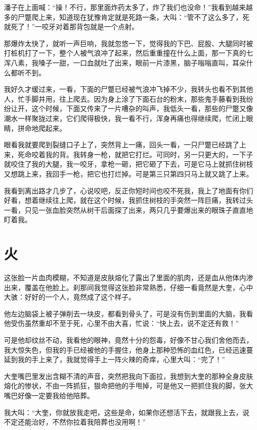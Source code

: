 潘子在上面喊：“操！不行，那里面炸药太多了，炸了我们也没命！”我看到越来越多的尸蹩爬上来，知道现在犹豫肯定就是死路一条，大叫：“管不了这么多了，死就死了！”一咬牙对着那背包就是一个点射。

那爆炸太快了，就听一声巨响，我就忽悠一下，觉得我的下巴、屁股、大腿同时被打桩机打了一下，整个人被气浪冲了起来，然后重重撞在什么上面，那一下真的七浑八素，我嗓子一甜，一口血就吐了出来，眼前一片漆黑，脑子嗡嗡直叫，耳朵什么都听不到。

我好久才缓过来，一看，下面的尸蹩已经被气浪冲飞掉不少，我转头也看不到其他人，忙手脚并用，往上爬去。因为身上涂了下面石台的粉末，那些鬼手藤看到我纷纷让开，这个时候，下面又传来了一片嘈杂的叫声，我低头一看，那些的尸蹩又像潮水一样聚拢过来，它们爬得极快，我一看不行，浑身再痛也得继续爬，忙闭上眼睛，拼命地爬起来。

眼看我就要爬到裂缝口子上了，突然背上一痛，回头一看，一只尸蹩已经跳了上来，死命咬着我的背。我转身一枪，就把它打烂。可同时，另一只更大的，一下子就咬住了我的大腿，我一咬牙，拿枪一砸，把它砸了下去，可是它马上就抓住树枝又想跳上来，我回手一枪，把它也打烂掉。可是第三只第四只马上就又跳了上来。

我看到离出路才几步了，心说咬吧，反正你短时间也咬不死我，我上了地面有你们好看，想着继续往上爬，就在这个时候，我抓住树枝的手突然一阵巨痛，我转过头一看，只见一张血脸突然从树干后面探了出来，两只几乎要爆出来的眼珠子直直地盯着我。

\chapter{火}

这张脸一片血肉模糊，不知道是皮肤熔化了露出了里面的肌肉，还是血从他体内渗出来，覆盖在他脸上。刹那间我觉得这张脸非常熟悉，仔细一看竟然是大奎，心中大骇：好好的一个人，竟然成了这个样子。

他左边脑袋上被子弹削去一块皮，都看到骨头了，可是没有伤到里面的大脑，我看他受伤虽然重却不至于死，心里不由大喜，忙说：“快上去，说不定还有救！”

可是他却纹丝不动，我看他的眼神，竟然十分的怨毒，好像不甘心我们舍他而去，我大惊失色，但我的手已经被他的手握住，他身上那种恐怖的血红色，已经迅速蔓延到我的手上来了，我就觉得手上一阵火辣的奇痒，心里大叫：“完了！”

大奎嘴巴里发出含糊不清的声音，突然把我向下面拉，我想到大奎的那种全身皮肤熔化的惨状，不由一阵抓狂，狠命把他的手甩掉，可是他又一把抓住我的脚，张大嘴巴好像一定要我给他陪葬。

我大叫：“大奎，你就放我走吧，这些是命，如果你还想活下去，就跟我上去，说不定还能治好，不然你拉着我陪葬也没用啊！”

